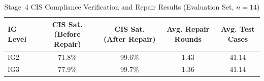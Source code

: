 \begin{table}[t]
\caption{Stage~4 CIS Compliance Verification and Repair Results
(Evaluation Set, $n=14$)}
\label{tab:stage4}
\centering
\small
\begin{tabular}{lcccc}
\hline
\textbf{IG Level} & \textbf{CIS Sat. (Before Repair)}
                  & \textbf{CIS Sat. (After Repair)}
                  & \textbf{Avg. Repair Rounds}
                  & \textbf{Avg. Test Cases} \\
\hline
IG2 & 71.8\% & 99.6\% & 1.43 & 41.14 \\
IG3 & 77.9\% & 99.7\% & 1.36 & 41.14 \\
\hline
\end{tabular}
\end{table}
